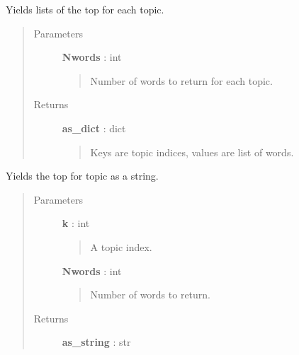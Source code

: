 \documentclass[letterpaper,10pt,english]{sphinxmanual}
\begin{document}
\begin{fulllineitems}
\begin{fulllineitems}
\end{fulllineitems}


\begin{fulllineitems}
\label{tethne.model.corpus.ldamodel:tethne.model.corpus.ldamodel.LDAModel.list_topics}
Yields lists of the top  for each topic.
\begin{quote}\begin{description}
\item[{Parameters}] \leavevmode
\textbf{Nwords} : int
\begin{quote}

Number of words to return for each topic.
\end{quote}

\item[{Returns}] \leavevmode
\textbf{as\_dict} : dict
\begin{quote}

Keys are topic indices, values are list of words.
\end{quote}

\end{description}\end{quote}

\end{fulllineitems}


\begin{fulllineitems}
\label{tethne.model.corpus.ldamodel:tethne.model.corpus.ldamodel.LDAModel.print_topic}
Yields the top  for topic  as a string.
\begin{quote}\begin{description}
\item[{Parameters}] \leavevmode
\textbf{k} : int
\begin{quote}

A topic index.
\end{quote}

\textbf{Nwords} : int
\begin{quote}

Number of words to return.
\end{quote}

\item[{Returns}] \leavevmode
\textbf{as\_string} : str
\begin{quote}


\end{quote}
\end{description}
\end{quote}
\end{fulllineitems}
\end{fulllineitems}
\end{document}

